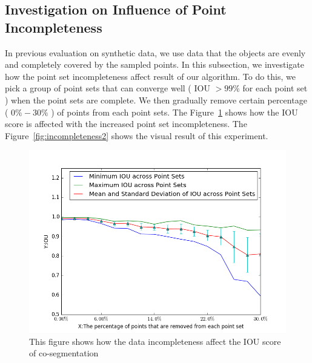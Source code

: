 \subsection{Investigation on Influence of Point Incompleteness}
In previous evaluation on synthetic data, we use data that the objects are evenly and completely covered by the sampled points. In this subsection, we investigate how the point set incompleteness affect result of our algorithm. To do this, we pick a group of point sets that can converge well ( IOU $> 99\%$ for each point set ) when the point sets are complete. We then gradually remove certain percentage ( $0\%-30\%$ ) of points from each point sets. The Figure~\ref{fig:incompleteness} shows how the IOU score is affected with the increased point set incompleteness. The Figure~\ref{fig:incompleteness2} shows the visual result of this experiment. 
\begin{figure}
	\centering
	\includegraphics[width=\linewidth]{images/incompleteness/IOU.png}
	\caption{This figure shows how the data incompleteness affect the IOU score of co-segmentation
		}
	\label{fig:incompleteness}
\end{figure}
